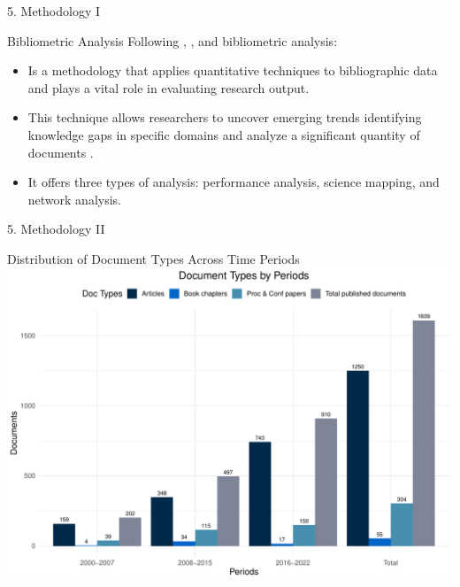 \documentclass[
  ignorenonframetext,
]{beamer}
\providecommand{\tightlist}{%
  \setlength{\itemsep}{0pt}\setlength{\parskip}{0pt}}
\begin{document}
\begin{frame}{5. Methodology I}
\protect\hypertarget{methodology-i}{}
\begin{block}{Bibliometric Analysis}
\protect\hypertarget{bibliometric-analysis}{}
Following \citet{donthu2021}, \citet{Aria2017}, \citet{ellegaard2015}
and \citet{Bornmann2015} bibliometric analysis:

\begin{itemize}
\tightlist
\item
  Is a methodology that applies quantitative techniques to bibliographic
  data and plays a vital role in evaluating research output.
\item
  This technique allows researchers to uncover emerging trends
  identifying knowledge gaps in specific domains and analyze a
  significant quantity of documents .
\item
  It offers three types of analysis: performance analysis, science
  mapping, and network analysis.
\end{itemize}
\end{block}
\end{frame}

\begin{frame}{5. Methodology II}
\protect\hypertarget{methodology-ii}{}
\vspace{0.5cm}

\begin{block}{Distribution of Document Types Across Time Periods}
\protect\hypertarget{distribution-of-document-types-across-time-periods}{}
\includegraphics{Presentation_bibliometric_files/figure-beamer/doc types-1.pdf}
\end{block}
\end{frame}
\end{document}
